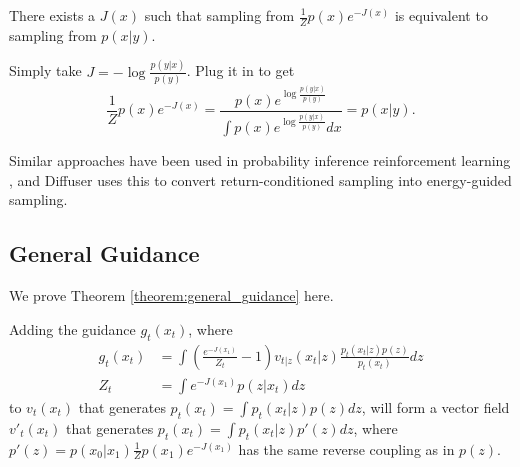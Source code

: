 There exists a $J(x)$ such that sampling from $\frac{1}{Z}p(x)e^{-J(x)}$ is equivalent to sampling from $p(x|y)$.

Simply take $J=-\log \frac{p(y|x)}{p(y)}$. Plug it in to get
\begin{equation}
    \frac{1}{Z}p(x)e^{-J(x)}=\frac{p(x)e^{\log \frac{p(y|x)}{p(y)}}}{\int p(x)e^{\log \frac{p(y|x)}{p(y)}}dx}=p(x|y).
\end{equation}

Similar approaches have been used in probability inference reinforcement learning \citep{levine_reinforcement_2018}, and Diffuser \citep{janner_planning_2022} uses this to convert return-conditioned sampling into energy-guided sampling.


\subsection{General Guidance}
\label{app:general_guidance}
We prove Theorem \ref{theorem:general_guidance} here.
\begin{theorem}
    Adding the guidance $g_t(x_t)$, where
    \begin{align}\label{eq:general_guidance_appendix}
        g_t(x_t) & = \int (\frac{e^{-J(x_1)}}{Z_t} - 1) v_{t|z}(x_t|z) \frac{p_t(x_t|z)p(z)}{p_t(x_t)} dz\\
        Z_t & = \int e^{-J(x_1)} p(z|x_t)dz
    \end{align}
    to $v_t(x_t)$ that generates $p_t(x_t) = \int p_t(x_t|z)p(z)dz$, will form a vector field $v'_t(x_t)$ that generates $p_t(x_t) = \int p_t(x_t|z)p'(z)dz$, where 
    $p'(z) = p(x_0|x_1) \frac{1}{Z}p(x_1)e^{-J(x_1)}$ has the same reverse coupling as in $p(z)$.
\end{theorem}

